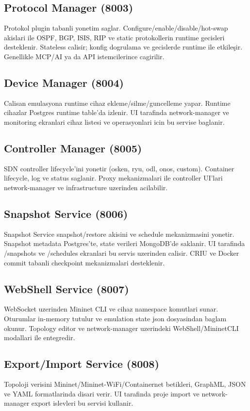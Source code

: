 \documentclass[conference]{IEEEtran}
\begin{document}
\subsection{Protocol Manager (8003)}
Protokol plugin tabanli yonetim saglar. Configure/enable/disable/hot-swap akislari ile OSPF, BGP, ISIS, RIP ve static protokollerin runtime gecisleri desteklenir. Stateless calisir; konfig dogrulama ve gecislerde runtime ile etkileşir. Genellikle MCP/AI ya da API istemcilerince cagirilir.

\subsection{Device Manager (8004)}
Calisan emulasyona runtime cihaz ekleme/silme/guncelleme yapar. Runtime cihazlar Postgres runtime
table’da izlenir. UI tarafinda network-manager ve monitoring ekranlari cihaz listesi ve operasyonlari icin bu servise baglanir.

\subsection{Controller Manager (8005)}
SDN controller lifecycle’ini yonetir (osken, ryu, odl, onos, custom). Container lifecycle, log ve status saglanir. Proxy mekanizmalari ile controller UI’lari network-manager ve infrastructure uzerinden acilabilir.

\subsection{Snapshot Service (8006)}
Snapshot Service snapshot/restore akisini ve schedule mekanizmasini yonetir. Snapshot metadata Postgres’te, state verileri MongoDB’de saklanir. UI tarafinda /snapshots ve /schedules ekranlari bu servis uzerinden calisir. CRIU ve Docker commit tabanli checkpoint mekanizmalari desteklenir.

\subsection{WebShell Service (8007)}
WebSocket uzerinden Mininet CLI ve cihaz namespace komutlari sunar. Oturumlar in-memory tutulur ve emulation state json dosyasindan baglam okunur. Topology editor ve network-manager uzerindeki WebShell/MininetCLI modallari ile entegredir.

\subsection{Export/Import Service (8008)}
Topoloji verisini Mininet/Mininet-WiFi/Containernet betikleri, GraphML, JSON ve YAML formatlarinda disari verir. UI tarafinda proje import ve network-manager export islevleri bu servisi kullanir.
\end{document}
